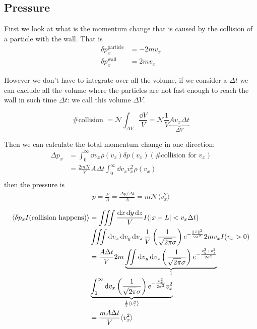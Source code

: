 \documentclass[12pt]{extarticle}
\newcommand{\anglebraces}[1]{
    \langle #1 \rangle
}
\begin{document}
\subsection{Pressure}

First we look at what is the momentum change that is caused by the collision of a particle with the wall.
That is
\begin{align}
    \delta p^\text{particle}_x & = -2 m v_x \\
    \delta p^\text{wall}_x     & = 2 m v_x
\end{align}

However we don't have to integrate over all the volume, if we consider a $\Delta t$ we can exclude all the volume where the particles are not fast enough to reach the wall in such time $\Delta t$: we call this volume $\Delta V$.

\begin{equation}
    \text{\# collision } = \mathscr{N} \int_{\Delta V} \frac{\dd{V}}{V} = \mathscr{N} \frac{1}{V} \underbrace{A v_x \Delta t}_{\Delta V}
\end{equation}

Then we can calculate the total momentum change in one direction:
\begin{align}
    \Delta p_x & = \int_0^\infty \dd{v_x} \rho(v_x) \delta p(v_x) (\text{\# collision for }v_x) \\
               & =\frac{2m \mathscr{N}}{V} A \Delta t \int_0^\infty \dd{v_x} v_x^2 \rho(v_x)    \\
\end{align}
then the pressure is
\begin{align}
    p = \frac{F}{A} = \frac{\Delta p / \Delta t}{A} = m \mathscr{N} \anglebraces{v_x^2}
\end{align}

\begin{align}
    \anglebraces{\delta p_x I(\text{collision happens})} & =
    \iiint \frac{\dd{x} \dd{y} \dd{z}}{V} I(\abs{x - L} < v_x \Delta t) \nonumber                                                                                                                                         \\
                                                         & \iiint \dd{v_x} \dd{v_y} \dd{v_z} \frac{1}{V} \left(\frac{1}{\sqrt{2 \pi} \sigma}\right) e^{-\frac{\norm{\vec v}^2}{2 \sigma^2}} 2 m v_x I(v_x > 0)            \\
                                                         & = \frac{A \Delta t}{V} 2m \underbrace{\iint  \dd{v_y} \dd{v_z} \left(\frac{1}{\sqrt{2 \pi} \sigma}\right) e^{-\frac{v_y^2 + v_z^2}{2 \sigma^2}}}_{1} \nonumber \\
                                                         & \underbrace{\int_0^\infty \dd{v_x} \left(\frac{1}{\sqrt{2 \pi} \sigma}\right) e^{-\frac{v_x^2 }{2 \sigma^2}}v_x^2}_{\frac{1}{2} \anglebraces{v_x^2}}           \\
                                                         & = \frac{m A \Delta t}{V} \anglebraces{v_x^2}
\end{align}
\end{document}
